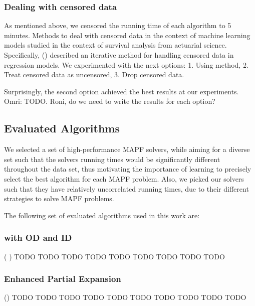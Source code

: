 \documentclass[letterpaper]{article} %
\newcommand\Roni[1]{\nb{\textbf{Roni:}}{red}{#1}}
\begin{document}


\subsubsection{Dealing with censored data}

As mentioned above, we censored the running time of each algorithm to 5 minutes. Methods to deal with censored data in the context of machine learning models studied in the context of survival analysis from actuarial science. Specifically, (\cite{schmee1979simple}) described an iterative method for handling censored data in regression models. We experimented with the next options: 1. Using \cite{schmee1979simple} method, 2. Treat censored data as uncensored, 3. Drop censored data.

Surprisingly, the second option achieved the best results at our experiments.
Omri: TODO. Roni, do we need to write the results for each option? \Roni{Ideally yes, but not now.}

\subsection{Evaluated Algorithms}
We selected a set of high-performance MAPF solvers, while aiming for a diverse set such that the solvers running times would be significantly different throughout the data set, thus motivating the importance of learning to precisely select the best algorithm for each MAPF problem. Also, we picked our solvers such that they have relatively uncorrelated running times, due to their different strategies to solve MAPF problems.

The following set of evaluated algorithms used in this work are:

\subsubsection{ \astar with OD and ID}
(\cite{standley2010finding} \cite{standley2012independence})
 TODO TODO TODO TODO TODO TODO TODO TODO TODO
\subsubsection{ Enhanced Partial Expansion \astar }  (\cite{goldenberg2014enhanced})
TODO TODO TODO TODO TODO TODO TODO TODO TODO TODO
\end{document}
